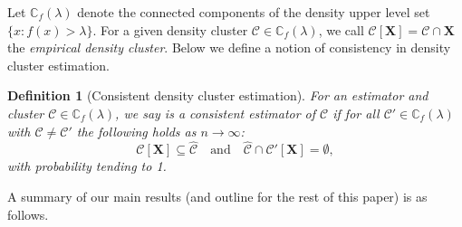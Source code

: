 \documentclass{article}
\newcommand{\1}{\mathbf{1}}
\newcommand{\Xbf}{\mathbf{X}}
\newcommand{\Cbb}{\mathbb{C}}
\newcommand{\Cset}{\mathcal{C}}
\theoremstyle{aldenthm}
\newtheorem{definition}{Definition}
\theoremstyle{aldenrmrk}
\begin{document}



Let $\Cbb_f(\lambda)$ denote the connected components of the density upper level
set $\{x : f(x) > \lambda\}$.  For a given density cluster $\Cset \in
\Cbb_f(\lambda)$, we call $\Cset[\Xbf] = \Cset \cap \Xbf$ the \emph{empirical
  density cluster}. Below we define a notion of consistency in density cluster
estimation.     

\begin{definition}[Consistent density cluster estimation]
\label{def: consistent_density_cluster_estimation}
For an estimator \smash{$\widehat{\Cset} \subseteq \Xbf$} and cluster 
$\Cset \in \Cbb_f(\lambda)$, we say \smash{$\widehat{\Cset}$} is a consistent
estimator of $\Cset$ if for all $\Cset' \in \Cbb_f(\lambda)$ with $\Cset \not=
\Cset'$ the following holds as $n \to \infty$: 
\begin{equation}
\label{eqn: consistent_density_cluster_recovery}
\Cset[\Xbf] \subseteq \widehat{\Cset} \quad \text{and} \quad
\widehat{\Cset} \cap \Cset'[\Xbf] = \emptyset,
\end{equation}
with probability tending to 1.
\end{definition}

A summary of our main results (and outline for the rest of this paper) is as
follows.  
\end{document}
